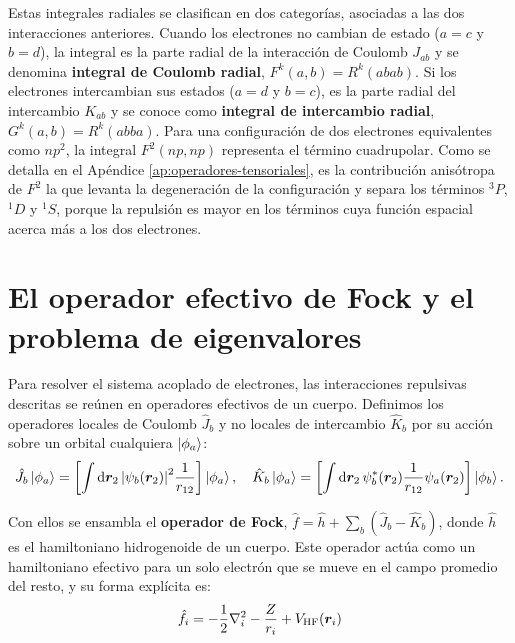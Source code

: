 Estas integrales radiales se clasifican en dos categorías, asociadas a las dos interacciones anteriores. Cuando los electrones no cambian de estado ($a=c$ y $b=d$), la integral es la parte radial de la interacción de Coulomb $J_{ab}$ y se denomina \textbf{integral de Coulomb radial}, $F^k(a,b) = R^k(abab)$. Si los electrones intercambian sus estados ($a=d$ y $b=c$), es la parte radial del intercambio $K_{ab}$ y se conoce como \textbf{integral de intercambio radial}, $G^k(a,b) = R^k(abba)$. Para una configuración de dos electrones equivalentes como $np^2$, la integral $F^2(np, np)$ representa el término cuadrupolar. Como se detalla en el Apéndice \ref{ap:operadores-tensoriales}, es la contribución anisótropa de $F^2$ la que levanta la degeneración de la configuración y separa los términos $^3P$, $^1D$ y $^1S$, porque la repulsión es mayor en los términos cuya función espacial acerca más a los dos electrones.

\section{El operador efectivo de Fock y el problema de eigenvalores}
\label{sec:fock_operator}

Para resolver el sistema acoplado de electrones, las interacciones repulsivas descritas se reúnen en operadores efectivos de un cuerpo. Definimos los operadores locales de Coulomb $\hat{J}_b$ y no locales de intercambio $\hat{K}_b$ por su acción sobre un orbital cualquiera $\ket{\phi_a}$:
\begin{equation}
  \hat{J}_b \ket{\phi_a} = \qty[ \int \dd{\bm{r}_2} \abs{\psi_b(\bm{r}_2)}^2 \frac{1}{r_{12}} ] \ket{\phi_a}, \quad \hat{K}_b \ket{\phi_a} = \qty[ \int \dd{\bm{r}_2} \psi_b^*(\bm{r}_2) \frac{1}{r_{12}} \psi_a(\bm{r}_2) ] \ket{\phi_b}.
\end{equation}

Con ellos se ensambla el \textbf{operador de Fock}, $\hat{f} = \hat{h} + \sum_b (\hat{J}_b - \hat{K}_b)$, donde $\hat{h}$ es el hamiltoniano hidrogenoide de un cuerpo. Este operador actúa como un hamiltoniano efectivo para un solo electrón que se mueve en el campo promedio del resto, y su forma explícita es:
\begin{equation}
    \hat{f}_i = -\frac{1}{2}\laplacian_i - \frac{Z}{r_i} + V_{\text{HF}}(\bm{r}_i)
\end{equation}

